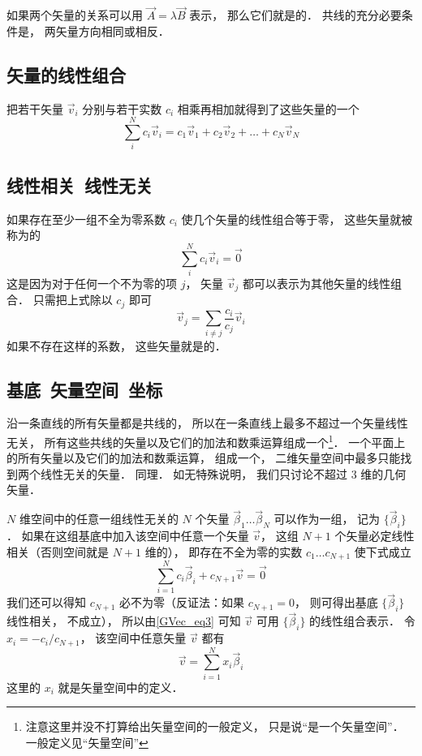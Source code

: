 如果两个矢量的关系可以用 $\vec A = \lambda\vec B$ 表示， 那么它们就是的． 共线的充分必要条件是， 两矢量方向相同或相反．

\subsection{矢量的线性组合}
把若干矢量 $\vec v_i$ 分别与若干实数 $c_i$ 相乘再相加就得到了这些矢量的一个
\begin{equation}
\sum_i^N c_i \vec v_i = c_1\vec v_1 + c_2\vec v_2 +\dots +c_N \vec v_N
\end{equation}

\subsection{线性相关\ 线性无关}
如果存在至少一组不全为零系数 $c_i$ 使几个矢量的线性组合等于零， 这些矢量就被称为的
\begin{equation}\label{GVec_eq2}
\sum_i^N c_i \vec v_i = \vec 0
\end{equation}
这是因为对于任何一个不为零的项 $j$， 矢量 $\vec v_j$ 都可以表示为其他矢量的线性组合． 只需把上式除以 $c_j$ 即可
\begin{equation}\label{GVec_eq3}
\vec v_j = \sum_{i \ne j}\frac{c_i}{c_j} \vec v_i
\end{equation}
如果不存在这样的系数， 这些矢量就是的． 

\subsection{基底\ 矢量空间\ 坐标}
沿一条直线的所有矢量都是共线的， 所以在一条直线上最多不超过一个矢量线性无关， 所有这些共线的矢量以及它们的加法和数乘运算组成一个\footnote{注意这里并没不打算给出矢量空间的一般定义， 只是说“是一个矢量空间”． 一般定义见“矢量空间”}． 一个平面上的所有矢量以及它们的加法和数乘运算， 组成一个， 二维矢量空间中最多只能找到两个线性无关的矢量． 同理． 如无特殊说明， 我们只讨论不超过 3 维的几何矢量．

$N$ 维空间中的任意一组线性无关的 $N$ 个矢量 $\vec \beta_1\dots \vec \beta_N$ 可以作为一组， 记为 $\{\vec \beta_i\}$． 如果在这组基底中加入该空间中任意一个矢量 $\vec v$， 这组 $N+1$ 个矢量必定线性相关（否则空间就是 $N+1$ 维的）， 即存在不全为零的实数 $c_1\dots c_{N+1}$ 使下式成立
\begin{equation}
\sum_{i=1}^N c_i \vec \beta_i + c_{N+1} \vec v = \vec 0
\end{equation}
我们还可以得知 $c_{N+1}$ 必不为零（反证法：如果 $c_{N+1} = 0$， 则可得出基底 $\{\vec \beta_i\}$ 线性相关， 不成立）， 所以由\autoref{GVec_eq3} 可知 $\vec v$ 可用 $\{\vec \beta_i\}$ 的线性组合表示． 令 $x_i = -c_i/c_{N+1}$， 该空间中任意矢量 $\vec v$ 都有
\begin{equation}\label{GVec_eq5}
\vec v = \sum_{i=1}^N x_i \vec \beta_i
\end{equation}
这里的 $x_i$ 就是矢量空间中的定义．

